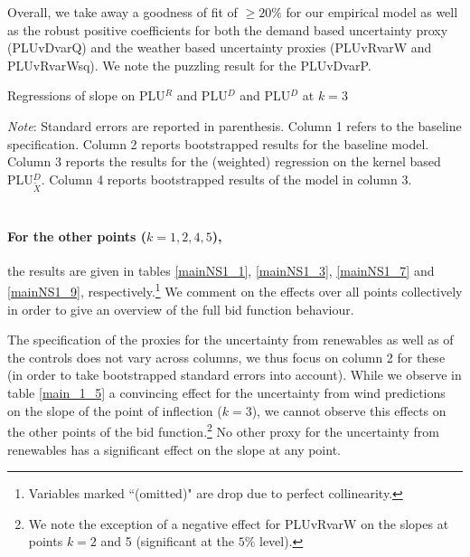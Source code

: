 Overall, we take away a goodness of fit of $\geq 20\%$ for our empirical model as well as the robust positive coefficients for both the demand based uncertainty proxy (PLUvDvarQ) and the weather based uncertainty proxies (PLUvRvarW and PLUvRvarWsq). We note the puzzling result for the PLUvDvarP. 

%

\begin{table}[!ht]
\vspace{-2.38cm}

\caption{\label{main_1_5} Regressions of slope on PLU$^R$ and PLU$^{D}$ and PLU$^{D}$ at $k=3$}
\emph{Note}: Standard errors are reported in parenthesis. Column 1 refers to the baseline specification. Column 2 reports bootstrapped results for the baseline model. Column 3 reports the results for the (weighted) regression on the kernel based PLU$^D_{\tilde{X}}$. Column 4 reports bootstrapped results of the model in column 3. 
\end{table}
\pagestyle{empty}

\section*{}
\paragraph{For the other points  ($k=1,2,4,5$),} the results are given in tables \ref{mainNS1_1}, \ref{mainNS1_3}, \ref{mainNS1_7} and \ref{mainNS1_9}, respectively.\footnote{Variables marked ``(omitted)" are drop due to perfect collinearity.} We comment on the effects over all points collectively in order to give an overview of the full bid function behaviour. %

The specification of the proxies for the uncertainty from renewables as well as of the controls does not vary across columns, we thus focus on column 2 for these (in order to take bootstrapped standard errors into account). 
While we observe in table \ref{main_1_5} a convincing effect for the uncertainty from wind predictions on the slope of the point of inflection ($k=3$), we cannot observe this effects on the other points of the bid function.\footnote{We note the exception of a negative effect for PLUvRvarW on the slopes at points $k=2$ and 5 (significant at the $5\%$ level).} No other proxy for the uncertainty from renewables has a significant effect on the slope at any point. \\

